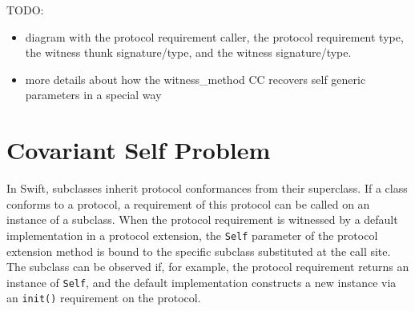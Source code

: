 \documentclass[a4paper,headsepline,bibliography=totoc,toc=flat,fleqn,twoside=semi]{scrbook}
\theoremstyle{definition}
\theoremstyle{definition}
\theoremstyle{definition}
\begin{document}
TODO:
\begin{itemize}
\item diagram with the protocol requirement caller, the protocol requirement type, the witness thunk signature/type, and the witness signature/type.
\item more details about how the witness\_method CC recovers self generic parameters in a special way
\end{itemize}

\section{Covariant Self Problem}

In Swift, subclasses inherit protocol conformances from their superclass. If a class conforms to a protocol, a requirement of this protocol can be called on an instance of a subclass. When the protocol requirement is witnessed by a default implementation in a protocol extension, the \texttt{Self} parameter of the protocol extension method is bound to the specific subclass substituted at the call site. The subclass can be observed if, for example, the protocol requirement returns an instance of \texttt{Self}, and the default implementation constructs a new instance via an \texttt{init()} requirement on the protocol.
\end{document}
